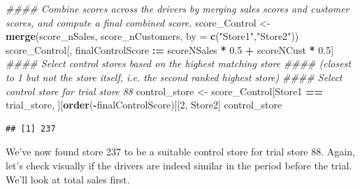 \documentclass[
]{article}
\newenvironment{Shaded}{\begin{snugshade}}{\end{snugshade}}
\newcommand{\CommentTok}[1]{\textcolor[rgb]{0.56,0.35,0.01}{\textit{#1}}}
\newcommand{\DataTypeTok}[1]{\textcolor[rgb]{0.13,0.29,0.53}{#1}}
\newcommand{\DecValTok}[1]{\textcolor[rgb]{0.00,0.00,0.81}{#1}}
\newcommand{\ErrorTok}[1]{\textcolor[rgb]{0.64,0.00,0.00}{\textbf{#1}}}
\newcommand{\FloatTok}[1]{\textcolor[rgb]{0.00,0.00,0.81}{#1}}
\newcommand{\KeywordTok}[1]{\textcolor[rgb]{0.13,0.29,0.53}{\textbf{#1}}}
\newcommand{\NormalTok}[1]{#1}
\newcommand{\OperatorTok}[1]{\textcolor[rgb]{0.81,0.36,0.00}{\textbf{#1}}}
\newcommand{\StringTok}[1]{\textcolor[rgb]{0.31,0.60,0.02}{#1}}
\begin{document}
\begin{Shaded}
\begin{Highlighting}[]
\CommentTok{#### Combine scores across the drivers by merging sales scores and customer scores, and compute a final combined score.}
\NormalTok{score_Control <-}\StringTok{ }\KeywordTok{merge}\NormalTok{(score_nSales, score_nCustomers, }\DataTypeTok{by =} \KeywordTok{c}\NormalTok{(}\StringTok{"Store1"}\NormalTok{,}\StringTok{"Store2"}\NormalTok{))}
\NormalTok{score_Control[, finalControlScore }\OperatorTok{:}\ErrorTok{=}\StringTok{ }\NormalTok{scoreNSales }\OperatorTok{*}\StringTok{ }\FloatTok{0.5} \OperatorTok{+}\StringTok{ }\NormalTok{scoreNCust }\OperatorTok{*}\StringTok{ }\FloatTok{0.5}\NormalTok{]}
\CommentTok{#### Select control stores based on the highest matching store}
\CommentTok{#### (closest to 1 but not the store itself, i.e. the second ranked highest store)}
\CommentTok{#### Select control store for trial store 88}
\NormalTok{control_store <-}\StringTok{ }\NormalTok{score_Control[Store1 }\OperatorTok{==}\StringTok{ }\NormalTok{trial_store, ][}\KeywordTok{order}\NormalTok{(}\OperatorTok{-}\NormalTok{finalControlScore)][}\DecValTok{2}\NormalTok{, Store2]}
\NormalTok{control_store}
\end{Highlighting}
\end{Shaded}

\begin{verbatim}
## [1] 237
\end{verbatim}

We've now found store 237 to be a suitable control store for trial store
88. Again, let's check visually if the drivers are indeed similar in the
period before the trial. We'll look at total sales first.
\end{document}
